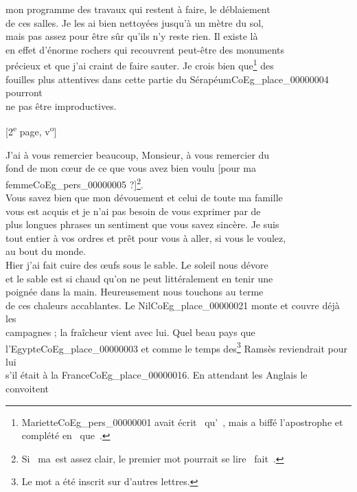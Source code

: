\documentclass{book}
\begin{document}
mon programme des travaux qui restent à faire, le déblaiement\\
de ces salles. Je les ai bien nettoyées jusqu’à un mètre du sol,\\
mais pas assez pour être sûr qu’ils n’y reste rien. Il existe là\\
en effet d’énorme rochers qui recouvrent peut-être des monuments\\
précieux et que j’ai craint de faire sauter. Je crois bien que\footnote{Mariette\gls{CoEg_pers_00000001} avait écrit \og ~qu'~\fg, mais a biffé l'apostrophe et complété en \og ~que~\fg.} des\\
fouilles plus attentives dans cette partie du Sérapéum\gls{CoEg_place_00000004} pourront\\
ne pas être improductives.
{\footnotesize \begin{center} {[2\textsuperscript{e} page, v\textsuperscript{o}]}\end{center}}
\indent J’ai à vous remercier beaucoup, Monsieur, à vous remercier du\\
fond de mon cœur de ce que vous avez bien voulu [pour ma femme\gls{CoEg_pers_00000005} ?]\footnote{Si \og ~ma~\fg est assez clair, le premier mot pourrait se lire \og ~fait~\fg.}.\\
Vous savez bien que mon dévouement et celui de toute ma famille\\
vous est acquis et je n’ai pas besoin de vous exprimer par de\\
plus longues phrases un sentiment que vous savez sincère. Je suis\\
tout entier à vos ordres et prêt pour vous à aller, si vous le voulez,\\
au bout du monde.\\
\indent Hier j’ai fait cuire des œufs sous le sable. Le soleil nous dévore\\
et le sable est si chaud qu’on ne peut littéralement en tenir une\\
poignée dans la main. Heureusement nous touchons au terme\\
de ces chaleurs accablantes. Le Nil\gls{CoEg_place_00000021} monte et couvre déjà les\\
campagnes ; la fraîcheur vient avec lui. Quel beau pays que\\
l’Egypte\gls{CoEg_place_00000003} et comme le temps des\footnote{Le mot a été inscrit sur d'autres lettres.} Ramsès reviendrait pour lui\\
s’il était à la France\gls{CoEg_place_00000016}. En attendant les Anglais le convoitent\\
\end{document}

